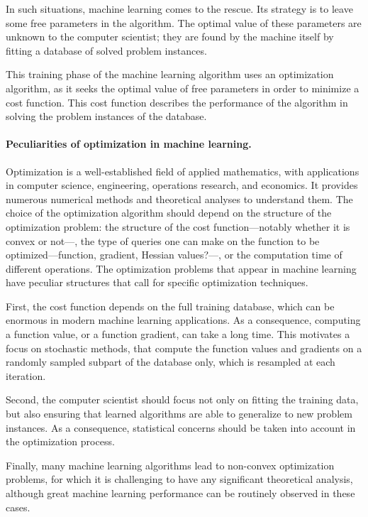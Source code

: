 \documentclass[11pt,reqno]{article}
\numberwithin{equation}{section}
\theoremstyle{plain}
\theoremstyle{definition}
\theoremstyle{remark}
\begin{document}
In such situations, machine learning comes to the rescue. Its strategy is to leave some free parameters in the algorithm. The optimal value of these parameters are unknown to the computer scientist; they are found by the machine itself by fitting a database of solved problem instances. 

This training phase of the machine learning algorithm uses an optimization algorithm, as it seeks the optimal value of free parameters in order to minimize a cost function. This cost function describes the performance of the algorithm in solving the problem instances of the database. 

\paragraph{Peculiarities of optimization in machine learning.}Optimization is a well-established field of applied mathematics, with applications in computer science, engineering, operations research, and economics. It provides numerous numerical methods and theoretical analyses to understand them. The choice of the optimization algorithm should depend on the structure of the optimization problem: the structure of the cost function---notably whether it is convex or not---, the type of queries one can make on the function to be optimized---function, gradient, Hessian values?---, or the computation time of different operations. The optimization problems that appear in machine learning have peculiar structures that call for specific optimization techniques. 

First, the cost function depends on the full training database, which can be enormous in modern machine learning applications. As a consequence, computing a function value, or a function gradient, can take a long time. This motivates a focus on stochastic methods, that compute the function values and gradients on a randomly sampled subpart of the database only, which is resampled at each iteration. 

Second, the computer scientist should focus not only on fitting the training data, but also ensuring that learned algorithms are able to generalize to new problem instances. As a consequence, statistical concerns should be taken into account in the optimization process.

Finally, many machine learning algorithms lead to non-convex optimization problems, for which it is challenging to have any significant theoretical analysis, although great machine learning performance can be routinely observed in these cases. 
\end{document}
